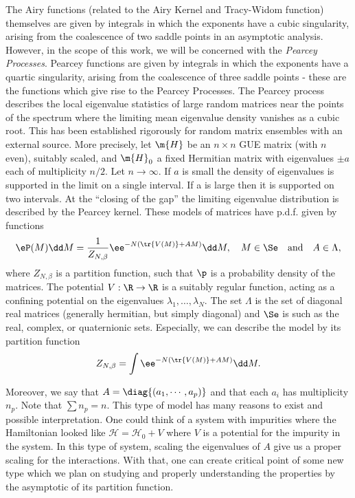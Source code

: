 The Airy functions (related to the Airy Kernel and Tracy-Widom function) themselves are given by integrals in which the exponents have a cubic singularity, arising from the coalescence of two saddle points in an asymptotic analysis. However, in the scope of this work, we will be concerned with the \textit{Pearcey Processes}. Pearcey functions are given by integrals in which the exponents have a quartic singularity, arising from the coalescence of three saddle points - these are the functions which give rise to the Pearcey Processes. The Pearcey process describes the local eigenvalue statistics of large random matrices near the points of the spectrum where the limiting mean eigenvalue density vanishes as a cubic root. This has been established rigorously for random matrix ensembles with an external source. More precisely, let $\m{H}$ be an $n \times n$ GUE matrix (with $n$ even), suitably scaled, and $\m{H}_0$ a fixed Hermitian matrix with eigenvalues $\pm a$ each of multiplicity $n/2$. Let $n \rightarrow \infty$. If $a$ is small the density of eigenvalues is supported in the limit on a single interval. If a is large then it is supported on two intervals. At the “closing of the gap” the limiting eigenvalue distribution is described by the Pearcey kernel. These models of matrices have p.d.f. given by functions 
\begin{equation}
	\eP(M) \dd M = \frac{1}{Z_{N, \beta}} \ee^{- N \left( \tr{V(M)} + AM \right)} \dd M,\quad  M \in \Se  \quad \text{and} \quad A \in \Lambda,
	\label{Equation: external source measure}
\end{equation}
where $Z_{N, \beta}$ is a partition function, such that $\p$ is a probability density of the matrices. The potential $V:\mathbb \R \to \R$ is a suitably regular function, acting as a confining potential on the eigenvalues $\lambda_1,\hdots, \lambda_N$. The set $\Lambda$ is the set of diagonal real matrices (generally hermitian, but simply diagonal) and $\Se$ is such as the real, complex, or quaternionic sets.  Especially, we can describe the model by its partition function
\begin{equation}
	Z_{N, \beta} = \int \ee^{- N \left( \tr{V(M)} + AM \right)} \dd M.
\label{Equation: Partition Function for External Field}
\end{equation}

Moreover, we say that $A = \diag{(a_1, \cdots, a_p)}$ and that each $a_i$ has multiplicity $n_p$. Note that $\sum n_p = n$.  This type of model has many reasons to exist and possible interpretation. One could think of a system with impurities where the Hamiltonian looked like $\mathcal{H}= \mathcal{H}_0 + V$ where $V$ is a potential for the impurity in the system. In this type of system, scaling the eigenvalues of $A$ give us a proper scaling for the interactions. With that, one can create critical point of some new type which we plan on studying and properly understanding the properties by the asymptotic of its partition function. 

